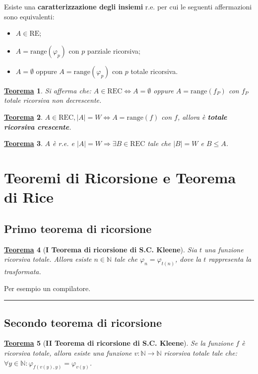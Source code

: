 \documentclass[a4paper]{article}
\newtheorem{theorem}{\textcolor{Red3}{\underline{Teorema}}}
\newcommand{\longline}{\noindent\rule{\textwidth}{0.4pt}}
\begin{document}
	\noindent
	Esiste una \textcolor{Red3}{\textbf{caratterizzazione degli insiemi}} r.e. per cui le seguenti affermazioni sono equivalenti:
	\begin{itemize}
		\item $A \in \mathrm{RE}$;
		\item $A = \mathrm{range}\left(\varphi_{p}\right)$ con $p$ parziale ricorsiva;
		\item $A = \emptyset$ oppure $A = \mathrm{range}\left(\varphi_{p}\right)$ con $p$ totale ricorsiva.
	\end{itemize}
	\begin{theorem}
		Si afferma che: $A \in \mathrm{REC} \iff A=\emptyset$ oppure $A = \mathrm{range}\left(f_{P}\right)$ con $f_{P}$ totale ricorsiva non decrescente.
	\end{theorem}
	\begin{theorem}
		$A \in \mathrm{REC},\left|A\right| = W \iff A = \mathrm{range}\left(f\right)$ con $f$, allora è \textcolor{Red3}{\textbf{totale ricorsiva crescente}}.
	\end{theorem}
	\begin{theorem}
		$A$ è r.e. e $\left|A\right| = W \Longrightarrow \exists B \in \mathrm{REC}$ tale che $\left|B\right| = W$ e $B \le A$.
	\end{theorem}\newpage
	
	\section{Teoremi di Ricorsione e Teorema di Rice}
	
	\subsection{Primo teorema di ricorsione}
	
	\begin{theorem}[\textbf{I Teorema di ricorsione di S.C. Kleene}]
		Sia $t$ una funzione ricorsiva totale. Allora esiste $n \in \mathbb{N}$ tale che $\varphi_{n} = \varphi_{t\left(n\right)}$, dove la $t$ rappresenta la trasformata.
	\end{theorem}	
	\noindent
	Per esempio un compilatore.
	
	\longline
	
	\subsection{Secondo teorema di ricorsione}
	
	\begin{theorem}[\textbf{II Teorema di ricorsione di S.C. Kleene}]
		Se la funzione $f$ è ricorsiva totale, allora esiste una funzione $v: \mathbb{N} \rightarrow \mathbb{N}$ ricorsiva totale tale che: $\forall y \in \mathbb{N}: \varphi_{f\left(v\left(y\right), y\right)} = \varphi_{v\left(y\right)}$.
	\end{theorem}
\end{document}
